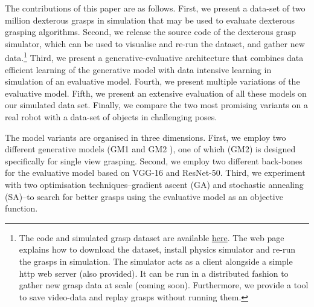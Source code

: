 The contributions of this paper are as follows. First, we present a data-set of two million dexterous grasps in simulation that may be used to evaluate dexterous grasping algorithms. Second, we release the source code of the dexterous grasp simulator, which can be used to visualise and re-run the dataset, and gather new data.\footnote{The code and simulated grasp dataset are available \href{https://rusen.github.io/DDG/}{here}. The web page explains how to download the dataset, install physics simulator and re-run the grasps in simulation. The simulator acts as a client alongside a simple http web server (also provided). It can be run in a distributed fashion to gather new grasp data at scale (coming soon). Furthermore, we provide a tool to save video-data and replay grasps without running them.} Third, we present a generative-evaluative architecture that combines data efficient learning of the generative model with data intensive learning in simulation of an evaluative model. Fourth, we present multiple variations of the evaluative model. Fifth, we present an extensive evaluation of all these models on our simulated data set. Finally, we compare the two most promising variants on a real robot with a data-set of objects in challenging poses.

The model variants are organised in three dimensions. First, we employ two different generative models (GM1 \cite{kopicki2015ijrr} and GM2 \cite{kopicki2019ijrr}), one of which (GM2) is designed specifically for single view grasping. Second, we employ two different back-bones for the evaluative model based on VGG-16 and ResNet-50. Third, we experiment with two optimisation techniques--gradient ascent (GA) and stochastic annealing (SA)--to search for better grasps using the evaluative model as an objective function.


